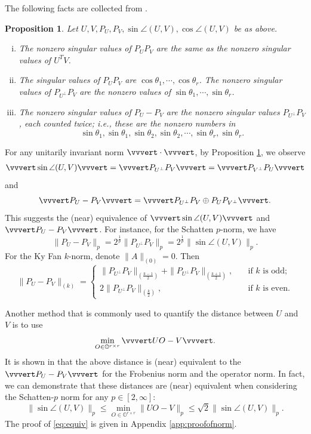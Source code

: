 \documentclass[reqno]{amsart}
\theoremstyle{plain}
\newtheorem{proposition}[theorem]{Proposition}
\theoremstyle{definition}
\begin{document}
The following facts are collected from \cite[Exercises VII. 1. 9 -- 1.11]{Bhatia}.
\begin{proposition} \label{prop:spaces}Let $U, V, P_U, P_V, \sin\angle (U,V) , \cos\angle (U,V) $ be as above.
\begin{enumerate}[(i)]
\item The nonzero singular values of $P_U P_V$ are the same as the nonzero singular values of $U^T V$.
\item The singular values of $P_U P_V$ are $\cos\theta_1, \cdots , \cos\theta_r$.
The nonzero singular values of $P_{U^\perp} P_V$ are the nonzero values of $\sin\theta_1, \cdots , \sin\theta_r$. 
\item The nonzero singular values of $P_U-P_V$ are the nonzero singular values $P_{U^\perp} P_V$, each counted twice; i.e., these are the nonzero numbers in $$\sin\theta_1, \sin\theta_1, \sin\theta_2, \sin\theta_2,\cdots, \sin\theta_r, \sin\theta_r.$$ 
\end{enumerate}
\end{proposition}

For any unitarily invariant norm $\vvvert \cdot \vvvert$, by Proposition \ref{prop:spaces},  we observe 
\begin{align}\label{eq:sineq}
\vvvert \sin\angle (U,V)  \vvvert=\vvvert P_{U^\perp} P_V\vvvert=\vvvert P_{V^\perp} P_U\vvvert
\end{align}
and $$\vvvert P_U- P_V\vvvert = \vvvert P_{U^\perp} P_V \oplus P_U P_{V^\perp} \vvvert.$$ This suggests the (near) equivalence of $\vvvert \sin\angle (U,V)  \vvvert$ and $\vvvert P_U- P_V\vvvert$.  For instance, for the Schatten $p$-norm, we have
\begin{equation*}
\|P_U- P_V\|_{p} = 2^{\frac{1}{p}}\|P_{U^\perp} P_V\|_p= 2^{\frac{1}{p}} \| \sin\angle (U,V) \|_{p}.
\end{equation*}
For the Ky Fan $k$-norm, denote $\|A\|_{(0)}=0$. Then
\begin{equation*}
\|P_U- P_V\|_{(k)} = 
\begin{cases}
\|P_{U^\perp} P_V\|_{(\frac{k-1}{2})} + \|P_{U^\perp} P_V\|_{(\frac{k+1}{2})}, &\quad \text{if $k$ is odd};\\
 2 \|P_{U^\perp} P_V\|_{(\frac{k}{2})}, &\quad \text{if $k$ is even}.
\end{cases}
\end{equation*}

Another method that is commonly used to quantify the distance between $U$ and $V$ is to use  
$$\min_{O\in \mathbb{O}^{r\times r}} \vvvert UO- V\vvvert.$$
It is shown in \cite[Lemma 2.6]{CCFM21} that the above distance is (near) equivalent to the $\vvvert P_U- P_V\vvvert$ for the Frobenius norm and the operator norm. In fact, we can demonstrate that these distances are (near) equivalent when considering the Schatten-$p$ norm for any $p\in [2,\infty]:$ 
\begin{equation}\label{eq:equiv}
 \|\sin\angle (U,V) \|_p\le \min_{O\in \mathbb{O}^{r\times r}} \| UO- V\|_p \le \sqrt{2}\|\sin\angle (U,V) \|_p.
\end{equation}
The proof of \eqref{eq:equiv} is given in Appendix \ref{app:proofofnorm}.
\end{document}
